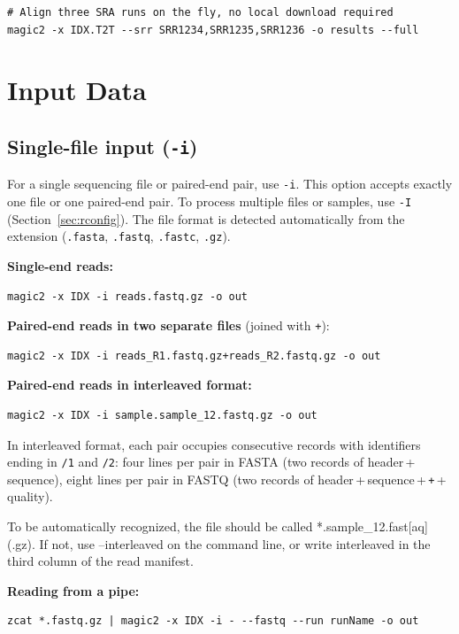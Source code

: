 \documentclass[11pt]{article}
\newcommand{\code}[1]{\texttt{#1}}
\begin{document}
\begin{lstlisting}
# Align three SRA runs on the fly, no local download required
magic2 -x IDX.T2T --srr SRR1234,SRR1235,SRR1236 -o results --full
\end{lstlisting}

\section{Input Data}

\subsection{Single-file input (\code{-i})}

For a single sequencing file or paired-end pair, use \code{-i}.
This option accepts exactly one file or one paired-end pair.
To process multiple files or samples, use \code{-I} (Section~\ref{sec:rconfig}).
The file format is detected automatically from the extension
(\code{.fasta}, \code{.fastq}, \code{.fastc}, \code{.gz}).

\textbf{Single-end reads:}
\begin{lstlisting}
magic2 -x IDX -i reads.fastq.gz -o out
\end{lstlisting}

\textbf{Paired-end reads in two separate files} (joined with \code{+}):
\begin{lstlisting}
magic2 -x IDX -i reads_R1.fastq.gz+reads_R2.fastq.gz -o out
\end{lstlisting}

\textbf{Paired-end reads in interleaved format:}
\begin{lstlisting}
magic2 -x IDX -i sample.sample_12.fastq.gz -o out
\end{lstlisting}

In interleaved format, each pair occupies consecutive records with
identifiers ending in \code{/1} and \code{/2}: four lines per pair
in FASTA (two records of header\,+\,sequence), eight lines per pair
in FASTQ (two records of header\,+\,sequence\,+\,\code{+}\,+\,quality).

To be automatically recognized, the file should be called *.sample\_12.fast[aq](.gz).
If not, use --interleaved on the command line, or write interleaved in the third column
of the read manifest.


\textbf{Reading from a pipe:}
\begin{lstlisting}
zcat *.fastq.gz | magic2 -x IDX -i - --fastq --run runName -o out
\end{lstlisting}
\end{document}
